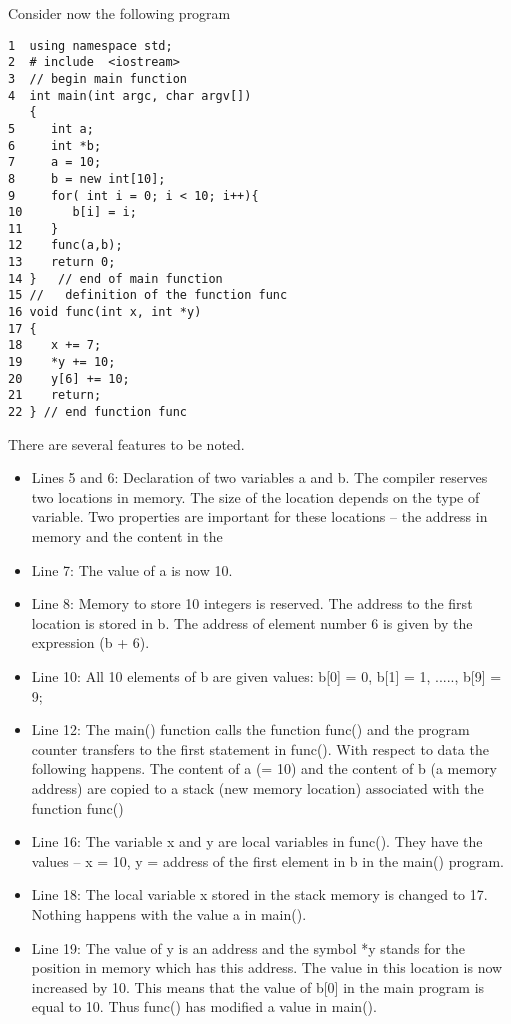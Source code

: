 Consider now the following program
\lstset{language=c++}
\begin{lstlisting}
1  using namespace std;
2  # include  <iostream> 
3  // begin main function
4  int main(int argc, char argv[])
   {
5     int a;                                     
6     int *b;                                    
7     a = 10;                                     
8     b = new int[10];
9     for( int i = 0; i < 10; i++){
10       b[i] = i;
11    }
12    func(a,b);
13    return 0;
14 }   // end of main function   
15 //   definition of the function func
16 void func(int x, int *y)
17 {
18    x += 7; 
19    *y += 10;
20    y[6] += 10;
21    return;
22 } // end function func
\end{lstlisting}
There are several features to be noted.
\begin{itemize}
%
\item Lines 5 and 6: Declaration of two variables a and b. The
compiler reserves two locations in memory. The size of the location
depends on the type of variable. Two properties are important for
these locations -- the address in memory and the content in the
%
\item Line 7: The value of a is now 10.
%
\item Line 8: Memory to store 10 integers is reserved. The
address to the first location is stored in b. The address of element
number 6 is given by the expression (b + 6). 
%
\item Line 10: All 10 elements of b are given values: b[0] = 0, b[1] =
1, ....., b[9] = 9;
% 
\item Line 12: The main() function calls the function func() and the
program counter transfers to the first statement in func().
With respect to data the following happens. The content of a 
(= 10) and the content of b (a memory address) are copied to a stack
(new memory location) associated with the function func()
%
\item Line 16: The variable x and y are local variables in
func(). They have the values -- x = 10, y = address of the first
element in b in the main() program.
%
\item Line 18: The local variable x stored in the stack memory is
changed to 17. Nothing happens with the value a in main().
% 
\item Line 19: The value of y is an address and the symbol *y stands for 
the position in memory which has this address. The value in this
location is now increased by 10. This means that the value of b[0] in
the main program is equal to 10. Thus func() has modified a value in main().

\end{itemize}
